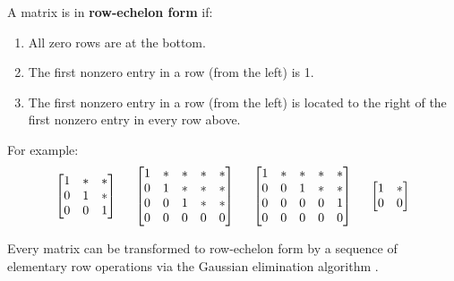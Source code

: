 \begin{definition}
A matrix is in {\bf row-echelon form} \cite[p.10]{KN} if:
\begin{enumerate}
\item All zero rows are at the bottom.
\item The first nonzero entry in a row (from the left) is 1.
\item The first nonzero entry in a row (from the left) is located to the right of the first nonzero entry in every row above.
\end{enumerate}
For example:
$$
\begin{bmatrix} 1 & * & * \\ 0 & 1 & * \\ 0 & 0 & 1 \end{bmatrix} \hspace{5mm}
\begin{bmatrix} 1 & * & * & * & * \\ 0 & 1 & * & * & * \\ 0 & 0 & 1 & * & * \\ 0 & 0 & 0 & 0 & 0 \end{bmatrix} \hspace{5mm}
\begin{bmatrix} 1 & * & * & * & * \\ 0 & 0 & 1 & * & * \\ 0 & 0 & 0 & 0 & 1 \\ 0 & 0 & 0 & 0 & 0 \end{bmatrix} \hspace{5mm}
\begin{bmatrix}  1 & * \\ 0 & 0 \end{bmatrix}
$$
\end{definition}

\begin{theorem}
Every matrix can be transformed to row-echelon form by a sequence of elementary row operations via the Gaussian elimination algorithm \cite[p.11]{KN}.
\end{theorem}

